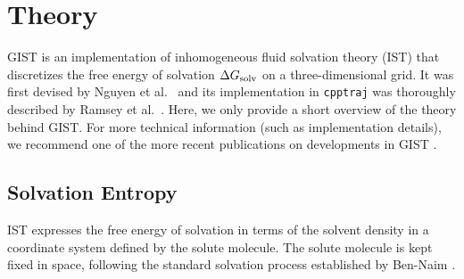 \documentclass[9pt,tutorial]{livecoms}
\newcommand{\dgsolv}{\Delta G_\textup{solv}}
\newcommand{\software}{\texttt}
\begin{document}
\section{Theory}
\label{sec:theory}
GIST is an implementation of inhomogeneous fluid solvation theory (IST) \cite{Lazaridis1998} that discretizes the free energy of solvation $\dgsolv$ on a three-dimensional grid. 
It was first devised by Nguyen et al.\ \cite{Nguyen2012} and its implementation in \software{cpptraj} was thoroughly described by Ramsey et al.\ \cite{Ramsey2016}.
Here, we only provide a short overview of the theory behind GIST.
For more technical information (such as implementation details), we recommend one of the more recent publications on developments in GIST \cite{Kraml2020,Chen2021,Roe2023-mpi-gist}.

\subsection{Solvation Entropy}


IST expresses the free energy of solvation in terms of the solvent density in a coordinate system defined by the solute molecule.
The solute molecule is kept fixed in space, following the standard solvation process established by Ben-Naim \cite{ben-naim-book}.
\end{document}
